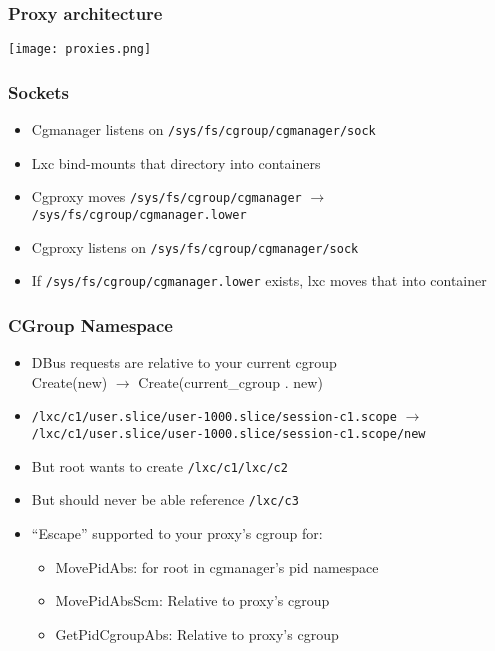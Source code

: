 \documentclass{beamer}
\begin{document}
\begin{frame}
\frametitle{Proxy architecture}
\texttt{[image: proxies.png]}
\end{frame}

\begin{frame}
\frametitle{Sockets}
\begin{itemize}
\item Cgmanager listens on {\tt /sys/fs/cgroup/cgmanager/sock}
\item Lxc bind-mounts that directory into containers
\item Cgproxy moves {\tt /sys/fs/cgroup/cgmanager} $\rightarrow$
{\tt /sys/fs/cgroup/cgmanager.lower}
\item Cgproxy listens on {\tt /sys/fs/cgroup/cgmanager/sock}
\item If {\tt /sys/fs/cgroup/cgmanager.lower} exists, lxc moves that into container
\end{itemize}
\end{frame}

\begin{frame}
\frametitle{CGroup Namespace}
\begin{itemize}
\item DBus requests are relative to your current cgroup \\
	Create(new) $\rightarrow$ Create(current\_cgroup . new)
\item {\tt /lxc/c1/user.slice/user-1000.slice/session-c1.scope} $\rightarrow$
{\tt /lxc/c1/user.slice/user-1000.slice/session-c1.scope/new}
\item But root wants to create {\tt /lxc/c1/lxc/c2}
\item But should never be able reference {\tt /lxc/c3}
\item ``Escape'' supported to your proxy's cgroup for:
	\begin{itemize}
	\item MovePidAbs: for root in cgmanager's pid namespace
	\item MovePidAbsScm: Relative to proxy's cgroup
	\item GetPidCgroupAbs: Relative to proxy's cgroup
	\end{itemize}
\end{itemize}
\end{frame}
\end{document}
